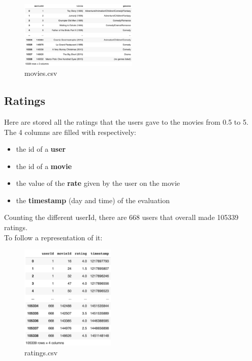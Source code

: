 \documentclass{article}
\begin{document}
\begin{figure}[ht]
      \begin{center}
            \includegraphics[width=0.5\textwidth]{images/movies data.png}
      \end{center}
      \caption{movies.csv}
      \label{fig:movies.csv}
\end{figure}

\newpage
\subsection{Ratings}
Here are stored all the ratings that the users gave to the movies from 0.5 to 5. The 4 columns are filled with respectively: 
\begin{itemize}
      \item the id of a \textbf{user}
      \item the id of a \textbf{movie}
      \item the value of the \textbf{rate} given by the user on the movie
      \item the \textbf{timestamp} (day and time) of the evaluation
\end{itemize}
Counting the different userId, there are 668 users that overall made 105339 ratings. \\
To follow a representation of it:
\begin{figure}[ht]
      \begin{center}
            \includegraphics[width=0.4\textwidth]{images/ratings data.png}
      \end{center}
      \caption{ratings.csv}
      \label{fig:ratings.csv}
\end{figure}\\
\end{document}
